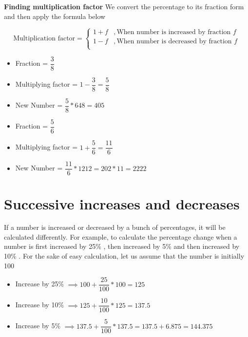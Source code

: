 \textbf{Finding multiplication factor}
We convert the percentage to its fraction form and then apply the formula below

\begin{equation*}
    \text{Multiplication factor} = \begin{cases}
        1 + f & , \text{When number is increased by fraction $f$} \\
        1 - f & , \text{When number is decreased by fraction $f$} \\
    \end{cases}    
\end{equation*}

\begin{itemize}
    \item Fraction = $\dfrac{3}{8}$
    \item Multiplying factor = $1 - \dfrac{3}{8} = \dfrac{5}{8}$
    \item New Number = $\dfrac{5}{8} * 648 = 405$
\end{itemize}

\begin{itemize}
    \item Fraction = $\dfrac{5}{6}$
    \item Multiplying factor = $1 + \dfrac{5}{6} = \dfrac{11}{6}$
    \item New Number = $\dfrac{11}{6} * 1212 = 202 * 11 = 2222$
\end{itemize}

\newpage


\section{Successive increases and decreases}
If a number is increased or decreased by a bunch of percentages, it will be calculated differently. For example, to calculate the percentage change when a number is first increased by 25\% , then increased by 5\% and then increased by 10\% . For the sake of easy calculation, let us assume that the number is initially 100

\begin{itemize}
    \item Increase by 25\% $\implies 100 + \dfrac{25}{100} * 100 = 125$ 
    \item Increase by 10\% $\implies 125 + \dfrac{10}{100} * 125 = 137.5$ 
    \item Increase by 5\% $\implies 137.5 + \dfrac{5}{100} * 137.5 = 137.5 + 6.875 = 144.375$ 
\end{itemize}


